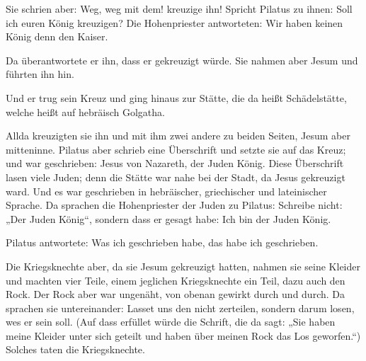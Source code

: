  Sie schrien aber: Weg, weg mit dem! kreuzige ihn!
Spricht Pilatus zu ihnen: Soll ich euren König kreuzigen? Die
Hohenpriester antworteten: Wir haben keinen König denn den Kaiser.

 Da überantwortete er ihn, dass er gekreuzigt würde. Sie
nahmen aber Jesum und führten ihn hin.

 Und er trug sein Kreuz und ging hinaus zur Stätte, die
da heißt Schädelstätte, welche heißt auf hebräisch Golgatha.

 Allda kreuzigten sie ihn und mit ihm zwei andere zu
beiden Seiten, Jesum aber mitteninne.  Pilatus aber
schrieb eine Überschrift und setzte sie auf das Kreuz; und war
geschrieben: Jesus von Nazareth, der Juden König.  Diese
Überschrift lasen viele Juden; denn die Stätte war nahe bei der Stadt,
da Jesus gekreuzigt ward. Und es war geschrieben in hebräischer,
griechischer und lateinischer Sprache.  Da sprachen die
Hohenpriester der Juden zu Pilatus: Schreibe nicht: „Der Juden König``,
sondern dass er gesagt habe: Ich bin der Juden König.

 Pilatus antwortete: Was ich geschrieben habe, das habe
ich geschrieben.

 Die Kriegsknechte aber, da sie Jesum gekreuzigt hatten,
nahmen sie seine Kleider und machten vier Teile, einem jeglichen
Kriegsknechte ein Teil, dazu auch den Rock. Der Rock aber war ungenäht,
von obenan gewirkt durch und durch.  Da sprachen sie
untereinander: Lasset uns den nicht zerteilen, sondern darum losen, wes
er sein soll. (Auf dass erfüllet würde die Schrift, die da sagt: „Sie
haben meine Kleider unter sich geteilt und haben über meinen Rock das
Los geworfen.``) Solches taten die Kriegsknechte.

